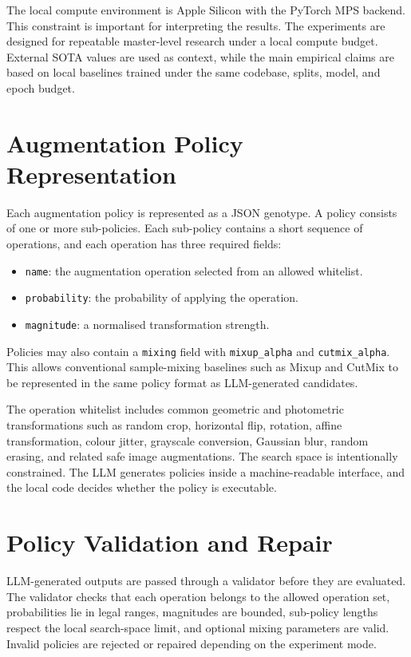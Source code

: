 \documentclass[12pt,a4paper]{report}
\begin{document}
The local compute environment is Apple Silicon with the PyTorch MPS backend. This constraint is important for interpreting the results. The experiments are designed for repeatable master-level research under a local compute budget. External SOTA values are used as context, while the main empirical claims are based on local baselines trained under the same codebase, splits, model, and epoch budget.

\section{Augmentation Policy Representation}

Each augmentation policy is represented as a JSON genotype. A policy consists of one or more sub-policies. Each sub-policy contains a short sequence of operations, and each operation has three required fields:

\begin{itemize}[leftmargin=*]
    \item \texttt{name}: the augmentation operation selected from an allowed whitelist.
    \item \texttt{probability}: the probability of applying the operation.
    \item \texttt{magnitude}: a normalised transformation strength.
\end{itemize}

Policies may also contain a \texttt{mixing} field with \texttt{mixup\_alpha} and \texttt{cutmix\_alpha}. This allows conventional sample-mixing baselines such as Mixup \citep{zhang2018mixup} and CutMix \citep{yun2019cutmix} to be represented in the same policy format as LLM-generated candidates.

The operation whitelist includes common geometric and photometric transformations such as random crop, horizontal flip, rotation, affine transformation, colour jitter, grayscale conversion, Gaussian blur, random erasing, and related safe image augmentations. The search space is intentionally constrained. The LLM generates policies inside a machine-readable interface, and the local code decides whether the policy is executable.

\section{Policy Validation and Repair}

LLM-generated outputs are passed through a validator before they are evaluated. The validator checks that each operation belongs to the allowed operation set, probabilities lie in legal ranges, magnitudes are bounded, sub-policy lengths respect the local search-space limit, and optional mixing parameters are valid. Invalid policies are rejected or repaired depending on the experiment mode.
\end{document}
